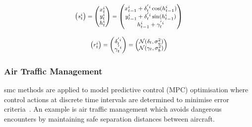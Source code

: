 \begin{equation}
\footnotesize
\begin{aligned}
  \begin{pmatrix}
    s^i_{t}    \\ 
  \end{pmatrix}
  =
  \begin{pmatrix}
    x^i_{t}    \\ 
    y^i_{t}    \\ 
    h^i_{t}    \\ 
  \end{pmatrix}
  =
  \begin{pmatrix}
  	x^i_{t-1} + \delta^{'i}_{t} \cos(h^i_{t-1}) \\
		y^i_{t-1} + \delta^{'i}_{t} \sin(h^i_{t-1}) \\
		h^i_{t-1} + \gamma^{'i}_{t} \\
  \end{pmatrix}
\end{aligned}
\label{eq:mcl_s}
\end{equation}

\begin{equation}
\footnotesize
\begin{aligned}
  \begin{pmatrix}
    r^i_{t}    \\ 
  \end{pmatrix}
  =
  \begin{pmatrix}
    \delta^{'i}_{t}    \\ 
    \gamma^{'i}_{t}    \\ 
  \end{pmatrix}
  =
  \begin{pmatrix}
  	\mathcal{N}(\delta_{t},\sigma_a^2) \\
		\mathcal{N}(\gamma_{t},\sigma_b^2) \\
  \end{pmatrix}
\end{aligned}
\label{eq:mcl_r}
\end{equation}


\subsubsection{Air Traffic Management}
\label{sec:atm}

\gls{smc} methods are applied to model predictive control (MPC) optimisation where control actions at discrete time intervals are determined to minimise error criteria~\cite{kantas09}.
An example is air traffic management which avoids dangerous encounters by maintaining safe separation distances between aircraft.


